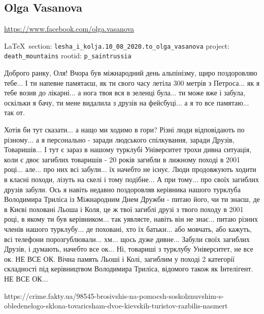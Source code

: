  
 
\subsection{Olga Vasanova}
\url{https://www.facebook.com/olga.vasanova}
  
\vspace{0.5cm}
 {\ifDEBUG\small\LaTeX~section: \verb|lesha_i_kolja.10_08_2020.to_olga_vasanova| project: \verb|death_mountains| rootid: \verb|p_saintrussia| \fi}
\vspace{0.5cm}
  
Доброго ранку, Оля! Вчора був міжнародний день альпінізму, щиро поздоровляю
тебе... І ти напевне памятаєш, як ти свого часу летіла 300 метрів з Петроса...
як я тебе возив до лікарні... а нога твоя вся в зеленці була... ти може вже і
забула, оскільки я бачу, ти мене видалила з друзів на фейсбуці... а я то все
памятаю... так от.

Хотів би тут сказати... а нащо ми
ходимо в гори? Різні люди відповідають по різному... а я персонально - заради
людського спілкування, заради Друзів, Товаришів... І тут є зараз в нашому
турклубі Університет трохи дивна ситуація, коли є двоє загиблих товаришів - 20
років загибли в лижному поході в 2001 році... але... про них всі забули... їх
начебто не існує. Люди продовжують ходити в класні походи, лізуть на скелі і
тому подібне... А при тому... про своїх загиблих друзів забули. Ось я навіть
недавно поздоровляв керівника нашого турклуба Володимира Триліса із Міжнародним
Днем Дружби - питаю його, чи ти знаєш, де в Києві поховані Льоша і Коля, це ж
твої загиблі друзі з твого походу в 2001 році, в якому ти був керівником... так
уявляєте, навіть він не знає... питаю різних членів нашого турклубу... де
поховані, хто їх батьки... або мовчать, або кажуть, всі телефони
порозгублювали... хм... щось дуже дивне... Забули своїх загиблих Друзів, і
думають, начебто все ок... Ні, товариші з турклубу Університет, не все ок. НЕ
ВСЕ ОК. Вічна память Льоші і Колі, загиблим у поході 2 категорії складності під
керівництвом Володимира Триліса, відомого також як Інтелігент. НЕ ВСЕ ОК...

https://crime.fakty.ua/98545-brosivshis-na-pomocsh-soskolznuvshim-s-obledenelogo-sklona-tovaricsham-dvoe-kievskih-turistov-razbilis-nasmert

